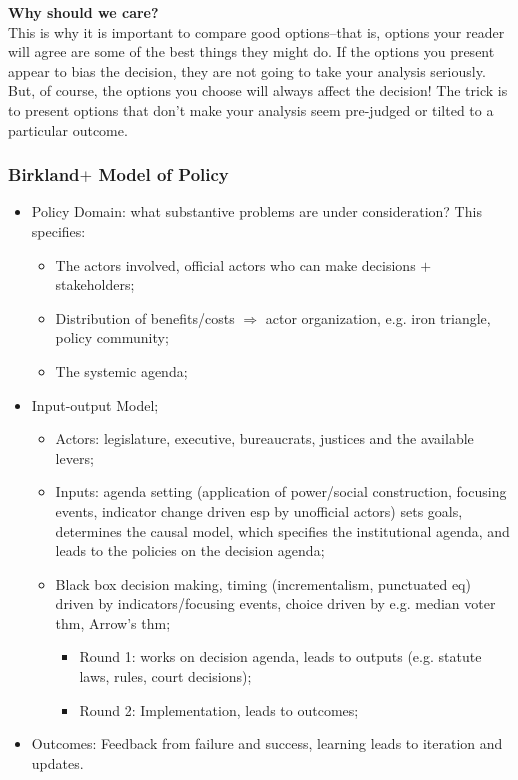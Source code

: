 \documentclass[aspectratio=169]{beamer}
\theoremstyle{principle}
\begin{document}
\begin{frame}

\begin{center}
\Huge\textbf{Why should we care?}\\
\bigskip
\bigskip
\large This is why it is important to compare good options–that is, options your reader will agree are some of the best things they might do. If the options you present appear to bias the decision, they are not going to take your analysis seriously. But, of course, the options you choose will always affect the decision! The trick is to present options that don’t make your analysis seem pre-judged or tilted to a particular outcome.
\\
\end{center}

\end{frame}

\begin{frame}
\frametitle{Birkland$+$ Model of Policy}
\begin{itemize}
\item Policy Domain: what substantive problems are under consideration?  This specifies:
\begin{itemize}
\item The actors involved, official actors who can make decisions $+$ stakeholders; 
\item Distribution of benefits/costs $\Rightarrow$ actor organization, e.g. iron triangle, policy community;
\item The systemic agenda; 
\end{itemize}
\bigskip
\item \color{black}Input-output Model;
\begin{itemize}
\item Actors: legislature, executive, bureaucrats, justices and the available levers;
\item Inputs: agenda setting (application of power/social construction, focusing events, indicator change driven esp by unofficial actors) sets goals, determines the causal model, which specifies the institutional agenda, and leads to the policies on the decision agenda;
\item Black box decision making, timing (incrementalism, punctuated eq) driven by indicators/focusing events, choice driven by e.g. median voter thm, Arrow's thm;
\begin{itemize}
\item Round 1: works on decision agenda, leads to outputs (e.g. statute laws, rules, court decisions);
\item Round 2: Implementation, leads to outcomes;
 \end{itemize}
\end{itemize}
\bigskip
\item Outcomes: Feedback from failure and success, learning leads to iteration and updates.
\end{itemize}
\end{frame}
\end{document}
